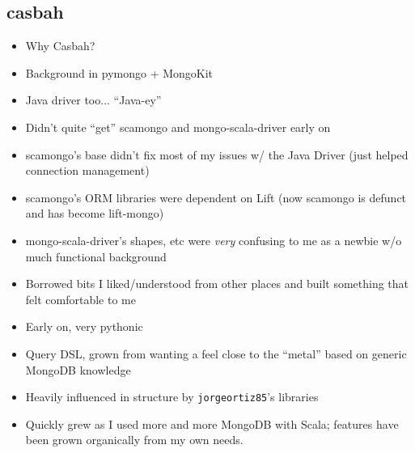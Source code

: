 \documentclass{beamer}
\newenvironment{itemizeframe}
               {\begin{frame}\startitemizeframe} 
               {\stopitemizeframe\end{frame}}
\newcommand\startitemizeframe{\begin{itemize}} \newcommand\stopitemizeframe{\end{itemize}}
\begin{document}
\begin{itemizeframe}
\subsection{casbah}
\begin{itemizeframe}
    \frametitle{Shameless Self Promotion}
    \item Why Casbah?
	\item     Background in pymongo + MongoKit 

	\item     Java driver too... ``Java-ey''

	\item     Didn't quite ``get'' scamongo and mongo-scala-driver early on

	\item     scamongo's base didn't fix most of my issues w/ the Java Driver (just helped connection management)

	\item     scamongo's ORM libraries were dependent on Lift (now scamongo is defunct and has become lift-mongo)

	\item     mongo-scala-driver's shapes, etc were \emph{very} confusing to me as a newbie w/o much functional background

\end{itemizeframe}

\begin{itemizeframe}
    \frametitle{Casbah is Born}
    \item Borrowed bits I liked/understood from other places and built something that felt comfortable to me 
    \item Early on, very pythonic
    \item Query DSL, grown from wanting a feel close to the ``metal'' based on generic MongoDB knowledge
    \item Heavily influenced in structure by \texttt{jorgeortiz85}'s libraries
    \item Quickly grew as I used more and more MongoDB with Scala; features have been grown organically from my own needs.
\end{itemizeframe}


\end{itemizeframe}
\end{document}
